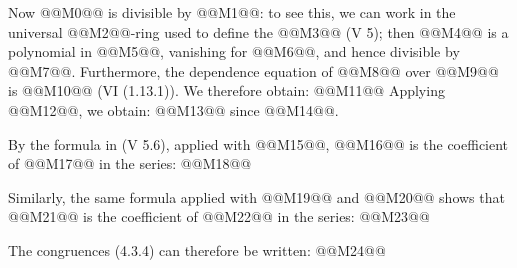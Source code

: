 Now @@M0@@ is divisible by @@M1@@: to see this, we can work in the universal @@M2@@-ring used to define the @@M3@@ (V 5); then @@M4@@ is a polynomial in @@M5@@, vanishing for @@M6@@, and hence divisible by @@M7@@. Furthermore, the dependence equation of @@M8@@ over @@M9@@ is @@M10@@ (VI (1.13.1)). We therefore obtain:
@@M11@@
Applying @@M12@@, we obtain:
@@M13@@
since @@M14@@.

By the formula in (V 5.6), applied with @@M15@@, @@M16@@ is the coefficient of @@M17@@ in the series:
@@M18@@

Similarly, the same formula applied with @@M19@@ and @@M20@@ shows that @@M21@@ is the coefficient of @@M22@@ in the series:
@@M23@@

The congruences (4.3.4) can therefore be written:
@@M24@@
